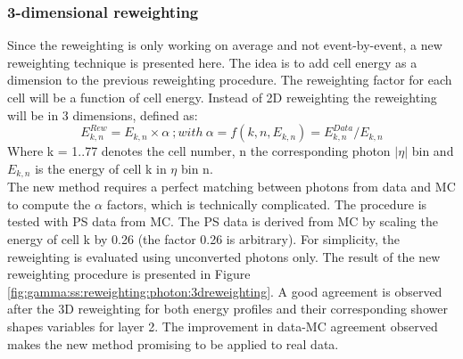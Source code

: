\label{tab:avg}


\subsubsection{3-dimensional reweighting}
Since the reweighting is only working on average and not event-by-event, a new reweighting technique is presented here. The idea is to add cell energy as a dimension to the previous reweighting procedure. The reweighting factor for each cell will be a function of cell energy. Instead of 2D reweighting the reweighting will be in 3 dimensions, defined as:
\begin{equation}
    E_{k,n}^{Rew} = E_{k,n} \times \alpha \ ; with \ \alpha = f(k,n,E_{k,n}) = E_{k,n}^{Data}/E_{k,n}
\end{equation}
Where k = 1..77 denotes the cell number, n the corresponding photon $|\eta|$ bin and $E_{k,n}$ is the energy of cell k in $\eta$ bin n. \\
The new method requires a perfect matching between photons from data and MC to compute the $\alpha$ factors, which is technically complicated. The procedure is tested with PS data from MC. The PS data is derived from MC by scaling the energy of cell k by 0.26 (the factor 0.26 is arbitrary). For simplicity, the reweighting is evaluated using unconverted photons only.
The result of the new reweighting procedure is presented in Figure \ref{fig:gamma:ss:reweighting:photon:3dreweighting}. A good agreement is observed after the 3D reweighting for both energy profiles and their corresponding shower shapes variables for layer 2. The improvement in data-MC agreement observed makes the new method promising to be applied to real data.
